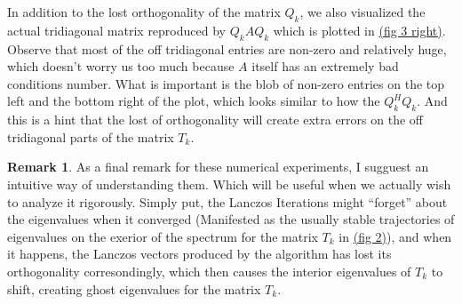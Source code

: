 \documentclass[]{article}
\theoremstyle{definition}
\newtheorem{remark}{Remark}[subsection]
\begin{document}
            In addition to the lost orthogonality of the matrix $Q_k$, we also visualized the actual tridiagonal matrix reproduced by $Q_kAQ_k$ which is plotted in \hyperref[fig:3]{(fig 3 right)}. Observe that most of the off tridiagonal entries are non-zero and relatively huge, which doesn't worry us too much because $A$ itself has an extremely bad conditions number. What is important is the blob of non-zero entries on the top left and the bottom right of the plot, which looks similar to how the $Q_k^HQ_k$. And this is a hint that the lost of orthogonality will create extra errors on the off tridiagonal parts of the matrix $T_k$. 
            \begin{remark}
                As a final remark for these numerical experiments, I sugguest an intuitive way of understanding them. Which will be useful when we actually wish to analyze it rigorously. Simply put, the Lanczos Iterations might ``forget'' about the eigenvalues when it converged (Manifested as the usually stable trajectories of eigenvalues on the exerior of the spectrum for the matrix $T_k$ in \hyperref[fig:2]{(fig 2)}), and when it happens, the Lanczos vectors produced by the algorithm has lost its orthogonality corresondingly, which then causes the interior eigenvalues of $T_k$ to shift, creating ghost eigenvalues for the matrix $T_k$. 
            \end{remark}
\end{document}
